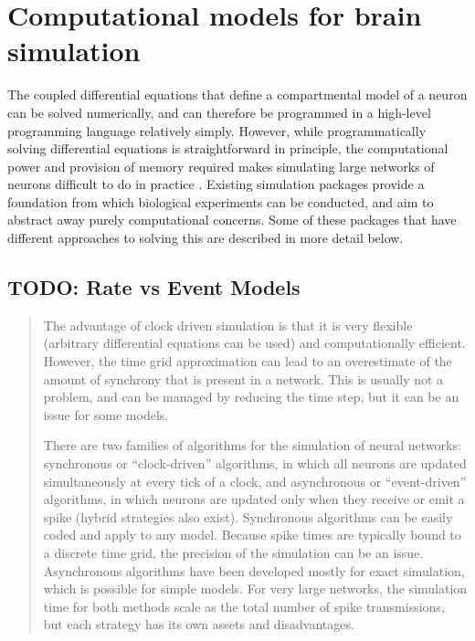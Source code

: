 

\section{Computational models for brain simulation}

The coupled differential equations that define a compartmental model of a neuron
can be solved numerically, and can therefore be programmed in a high-level
programming language relatively simply. However, while programmatically solving
differential equations is straightforward in principle, the computational power
and provision of memory required makes simulating large networks of neurons
difficult to do in practice \autocite{trappenberg_fundamentals_2009}. Existing
simulation packages provide a foundation from which biological experiments can
be conducted, and aim to abstract away purely computational concerns. Some of
these packages that have different approaches to solving this are described in
more detail below.

\subsection{TODO: Rate vs Event Models}

\begin{quote}
    The advantage of clock driven simulation is that it is very flexible
    (arbitrary differential equations can be used) and computationally
    efficient. However, the time grid approximation can lead to an overestimate
    of the amount of synchrony that is present in a network. This is usually not
    a problem, and can be managed by reducing the time step, but it can be an
    issue for some models.
    
    There are two families of algorithms for the simulation of neural networks: synchronous or “clock-driven” algorithms, in which all neurons are updated simultaneously at every tick of a clock, and asynchronous or “event-driven” algorithms, in which neurons are updated only when they receive or emit a spike (hybrid strategies also exist). Synchronous algorithms can be easily coded and apply to any model. Because spike times are typically bound to a discrete time grid, the precision of the simulation can be an issue. Asynchronous algorithms have been developed mostly for exact simulation, which is possible for simple models. For very large networks, the simulation time for both methods scale as the total number of spike transmissions, but each strategy has its own assets and disadvantages.
\end{quote}

